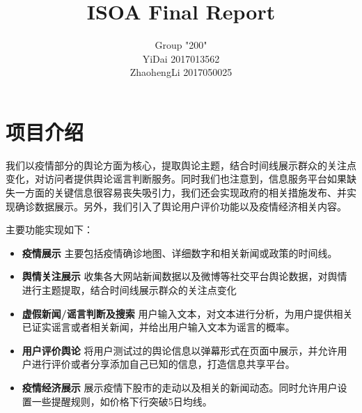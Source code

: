 \documentclass{article}
\title{ISOA Final Report}
\author{Group "200"\\YiDai 2017013562\\ZhaohengLi 2017050025}
\begin{document}
\maketitle

\section{项目介绍}
我们以疫情部分的舆论方面为核心，提取舆论主题，结合时间线展示群众的关注点变化，对访问者提供舆论谣言判断服务。同时我们也注意到，信息服务平台如果缺失一方面的关键信息很容易丧失吸引力，我们还会实现政府的相关措施发布、并实现确诊数据展示。另外，我们引入了舆论用户评价功能以及疫情经济相关内容。

主要功能实现如下：
\begin{itemize}
	\item{\textbf{疫情展示}} 主要包括疫情确诊地图、详细数字和相关新闻或政策的时间线。
	\item{\textbf{舆情关注展示}} 收集各大网站新闻数据以及微博等社交平台舆论数据，对舆情进行主题提取，结合时间线展示群众的关注点变化
	\item{\textbf{虚假新闻/谣言判断及搜索}} 用户输入文本，对文本进行分析，为用户提供相关已证实谣言或者相关新闻，并给出用户输入文本为谣言的概率。
	\item{\textbf{用户评价舆论}} 将用户测试过的舆论信息以弹幕形式在页面中展示，并允许用户进行评价或者分享添加自己已知的信息，打造信息共享平台。
	\item{\textbf{疫情经济展示}} 展示疫情下股市的走动以及相关的新闻动态。同时允许用户设置一些提醒规则，如价格下行突破5日均线。
\end{itemize}
\end{document}
